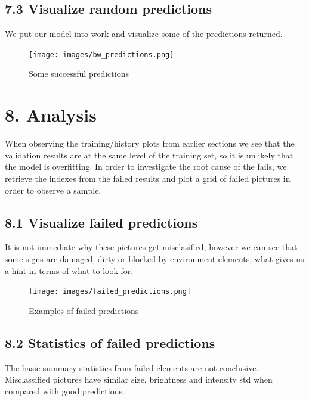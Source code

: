 \documentclass[
  11pt,
]{article}
\begin{document}
\hypertarget{visualize-random-predictions}{%
\subsection{7.3 Visualize random
predictions}\label{visualize-random-predictions}}

We put our model into work and visualize some of the predictions
returned.

\begin{figure}
\centering
\texttt{[image: images/bw\_predictions.png]}
\caption{Some successful predictions}
\end{figure}

\pagebreak

\hypertarget{analysis}{%
\section{8. Analysis}\label{analysis}}

When observing the training/history plots from earlier sections we see
that the validation results are at the same level of the training set,
so it is unlikely that the model is overfitting. In order to investigate
the root cause of the fails, we retrieve the indexes from the failed
results and plot a grid of failed pictures in order to observe a sample.

\hypertarget{visualize-failed-predictions}{%
\subsection{8.1 Visualize failed
predictions}\label{visualize-failed-predictions}}

It is not immediate why these pictures get misclasified, however we can
see that some signs are damaged, dirty or blocked by environment
elements, what gives us a hint in terms of what to look for.

\begin{figure}
\centering
\texttt{[image: images/failed\_predictions.png]}
\caption{Examples of failed predictions}
\end{figure}

\hypertarget{statistics-of-failed-predictions}{%
\subsection{8.2 Statistics of failed
predictions}\label{statistics-of-failed-predictions}}

The basic summary statistics from failed elements are not conclusive.
Misclassified pictures have similar size, brightness and intensity std
when compared with good predictions.
\end{document}
